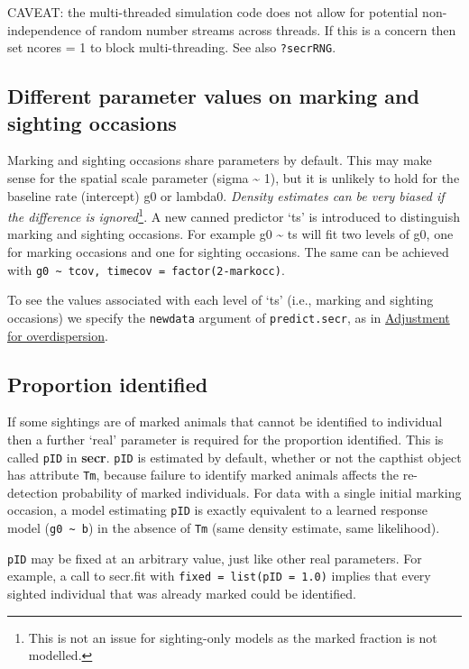 \documentclass[
]{book}
\begin{document}
CAVEAT: the multi-threaded simulation code does not allow for potential non-independence of random number streams across threads. If this is a concern then set ncores = 1 to block multi-threading. See also \texttt{?secrRNG}.

\subsection{Different parameter values on marking and sighting occasions}\label{ts}

Marking and sighting occasions share parameters by default. This may make sense for the spatial scale parameter (sigma \textasciitilde{} 1), but it is unlikely to hold for the baseline rate (intercept) g0 or lambda0. \emph{Density estimates can be very biased if the difference is ignored}\footnote{This is not an issue for sighting-only models as the marked fraction is not modelled.}. A new canned predictor `ts' is introduced to distinguish marking and sighting occasions. For example g0 \textasciitilde{} ts will fit two levels of g0, one for marking occasions and one for sighting occasions. The same can be achieved with \texttt{g0\ \textasciitilde{}\ tcov,\ timecov\ =\ factor(2-markocc)}.

To see the values associated with each level of `ts' (i.e., marking and sighting occasions) we specify the \texttt{newdata} argument of \texttt{predict.secr}, as in \hyperref[adjustoverdispersion]{Adjustment for overdispersion}.

\subsection{Proportion identified}\label{pID}

If some sightings are of marked animals that cannot be identified to individual then a further `real' parameter is required for the proportion identified. This is called \texttt{pID} in \textbf{secr}. \texttt{pID} is estimated by default, whether or not the capthist object has attribute \texttt{Tm}, because failure to identify marked animals affects the re-detection probability of marked individuals. For data with a single initial marking occasion, a model estimating \texttt{pID} is exactly equivalent to a learned response model (\texttt{g0\ \textasciitilde{}\ b}) in the absence of \texttt{Tm} (same density estimate, same likelihood).

\texttt{pID} may be fixed at an arbitrary value, just like other real parameters. For example, a call to secr.fit with \texttt{fixed\ =\ list(pID\ =\ 1.0)} implies that every sighted individual that was already marked could be identified.
\end{document}
